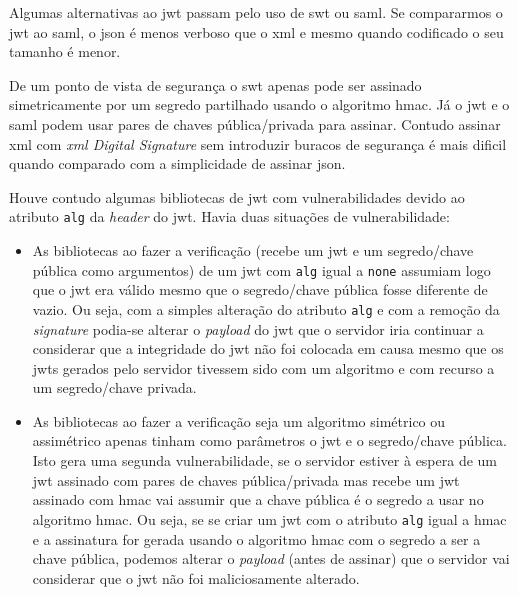 Algumas alternativas ao \acrshort{jwt} passam pelo uso de \acrfull{swt} ou \acrfull{saml}. Se compararmos o \acrshort{jwt} ao \acrshort{saml}, o \acrshort{json} é menos verboso que o \acrshort{xml} e mesmo quando codificado o seu tamanho é menor. 

De um ponto de vista de segurança o \acrshort{swt} apenas pode ser assinado simetricamente por um segredo partilhado usando o algoritmo \acrshort{hmac}. Já o \acrshort{jwt} e o \acrshort{saml} podem usar pares de chaves pública/privada para assinar. Contudo assinar \acrshort{xml} com \textit{\acrshort{xml} Digital Signature} sem introduzir buracos de segurança é mais dificil quando comparado com a simplicidade de assinar \acrshort{json}.~\cite{jwtio}

Houve contudo algumas bibliotecas de \acrshort{jwt} com vulnerabilidades devido ao atributo \texttt{alg} da \textit{header} do \acrshort{jwt}. Havia duas situações de vulnerabilidade:
\begin{itemize}
    \item As bibliotecas ao fazer a verificação (recebe um \acrshort{jwt} e um segredo/chave pública como argumentos) de um \acrshort{jwt} com \texttt{alg} igual a \texttt{none} assumiam logo que o \acrshort{jwt} era válido mesmo que o segredo/chave pública fosse diferente de vazio. Ou seja, com a simples alteração do atributo \texttt{alg} e com a remoção da \textit{signature} podia-se alterar o \textit{payload} do \acrshort{jwt} que o servidor iria continuar a considerar que a integridade do \acrshort{jwt} não foi colocada em causa mesmo que os \acrshort{jwt}s gerados pelo servidor tivessem sido com um algoritmo e com recurso a um segredo/chave privada.
    \item As bibliotecas ao fazer a verificação seja um algoritmo simétrico ou assimétrico apenas tinham como parâmetros o \acrshort{jwt} e o segredo/chave pública. Isto gera uma segunda vulnerabilidade, se o servidor estiver à espera de um \acrshort{jwt} assinado com pares de chaves pública/privada mas recebe um \acrshort{jwt} assinado com \acrshort{hmac} vai assumir que a chave pública é o segredo a usar no algoritmo \acrshort{hmac}. Ou seja, se se criar um \acrshort{jwt} com o atributo \texttt{alg} igual a \acrshort{hmac} e a assinatura for gerada usando o algoritmo \acrshort{hmac} com o segredo a ser a chave pública, podemos alterar o \textit{payload} (antes de assinar) que o servidor vai considerar que o \acrshort{jwt} não foi maliciosamente alterado.
\end{itemize}

